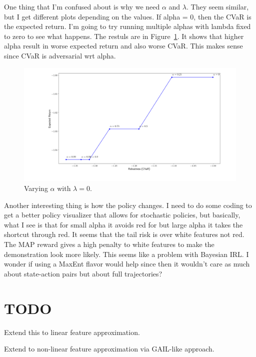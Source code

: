 \documentclass{article}
\begin{document}
One thing that I'm confused about is why we need $\alpha$ and $\lambda$. They seem similar, but I get different plots depending on the values. If alpha = 0, then the CVaR is the expected return. I'm going to try running multiple alphas with lambda fixed to zero to see what happens.
The restuls are in Figure~\ref{fig:varying_alpha}. It shows that higher alpha result in worse expected return and also worse CVaR. This makes sense since CVaR is adversarial wrt alpha.

\begin{figure}
\centering
\includegraphics[width=\linewidth]{figs/alpha_range.png}
\caption{Varying $\alpha$ with $\lambda = 0$.}
\label{fig:varying_alpha}
\end{figure}




Another interesting thing is how the policy changes. I need to do some coding to get a better policy visualizer that allows for stochastic policies, but basically, what I see is that for small alpha it avoids red for but large alpha it takes the shortcut through red. It seems that the tail risk is over white features not red. The MAP reward gives a high penalty to white features to make the demonstration look more likely. This seems like a problem with Bayesian IRL. I wonder if using a MaxEnt flavor would help since then it wouldn't care as much about state-action pairs but about full trajectories? 



	
\section{TODO}
Extend this to linear feature approximation.

Extend to non-linear feature approximation via GAIL-like approach.





	
\end{document}
